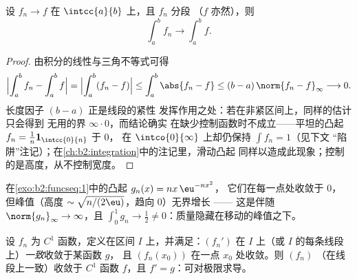 \begin{theorem}[线段上的积分]\label{thm:b2:funcseq:integration}
设 $f_n \to f$ 在 $\intcc{a}{b}$ 上，且 $f_n$ 分段
（$f$ 亦然），则
\[
\int_a^b f_n \longrightarrow \int_a^b f .
\]
\end{theorem}

\begin{proof}
由积分的线性与三角不等式可得
\[
\Bigl|\int_a^b f_n - \int_a^b f\Bigr|
= \Bigl|\int_a^b (f_n - f)\Bigr|
\leq \int_a^b\abs{f_n - f}
\leq (b - a)\,\norm{f_n - f}_\infty \longrightarrow 0 .
\]
长度因子 $(b - a)$ 正是线段的紧性
发挥作用之处：若在非紧区间上，同样的估计只会得到
无用的界 $\infty\cdot0$，而结论确实
在缺少控制函数时不成立——平坦的凸起 $f_n =
\frac1n\mathbf 1_{\intcc{0}{n}}$ 于 $0$，
在 $\intco{0}{\infty}$ 上却仍保持 $\int f_n = 1$（见下文
“陷阱”注记）；在\cref{ch:b2:integration}中的注记里，滑动凸起
同样以造成此现象；控制
的是高度，从不控制宽度。
\end{proof}

\begin{omfigure}

{\small 在\cref{exo:b2:funcseq:1}中的凸起 $g_n(x) = nx\,\eu^{-nx^2}$，
它们在每一点处收敛于 $0$，
但峰值（高度 $\sim\sqrt{n/(2\eu)}$，趋向
$0$）无界增长 —— 这是伴随
$\norm{g_n}_\infty \to \infty$，且 $\int_0^1 g_n \to \frac12
\neq 0$：质量隐藏在移动的峰值之下。}
\end{omfigure}

\begin{theorem}[求导]\label{thm:b2:funcseq:differentiation}
设 $f_n$ 为 $C^1$ 函数，定义在区间 $I$ 上，并满足：$(f_n')$
在 $I$ 上（或 $I$ 的每条线段上）\emph{一致}收敛于某函数 $g$，
且 $(f_n(x_0))$ 在一点 $x_0$ 处收敛。则 $(f_n)$
（在线段上一致）收敛于 $C^1$ 函数 $f$，且 $f'
= g$：可对极限求导。
\end{theorem}

